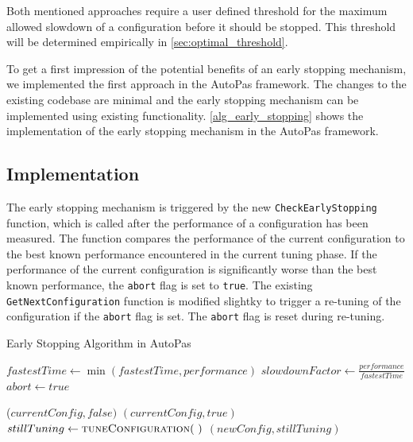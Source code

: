 \documentclass[conference]{IEEEtran}
\begin{document}
Both mentioned approaches require a user defined threshold for the maximum allowed slowdown of a configuration before it should be stopped. This threshold will be determined empirically in \autoref{sec:optimal_threshold}.

To get a first impression of the potential benefits of an early stopping mechanism, we implemented the first approach in the AutoPas framework. The changes to the existing codebase are minimal and the early stopping mechanism can be implemented using existing functionality. \autoref{alg_early_stopping} shows the implementation of the early stopping mechanism in the AutoPas framework.

\newpage

\subsection{Implementation}
The early stopping mechanism is triggered by the new \texttt{CheckEarlyStopping} function, which is called after the performance of a configuration has been measured. The function compares the performance of the current configuration to the best known performance encountered in the current tuning phase. If the performance of the current configuration is significantly worse than the best known performance, the \texttt{abort} flag is set to \texttt{true}. The existing \texttt{GetNextConfiguration} function is modified slightky to trigger a re-tuning of the configuration if the \texttt{abort} flag is set. The \texttt{abort} flag is reset during re-tuning.



\begin{algorithm}[H]
    \small
    \caption{Early Stopping Algorithm in AutoPas}
    \label{alg_early_stopping}
    \begin{algorithmic}[1]
        \State $fastestTime \gets \min(fastestTime, performance)$
        \State $slowdownFactor \gets \frac{performance}{fastestTime}$
        \State $abort \gets true$
        \EndIf
        \EndProcedure

        \vspace{0.5em}

        \State \Return ($currentConfig, false)$
            \State \Return $(currentConfig, true)$
            \Else
            \State $stillTuning \gets \Call{tuneConfiguration}{~}$
            \State \Return $(newConfig, stillTuning)$
        \EndIf
        \EndProcedure
    \end{algorithmic}

\end{algorithm}
\end{document}
